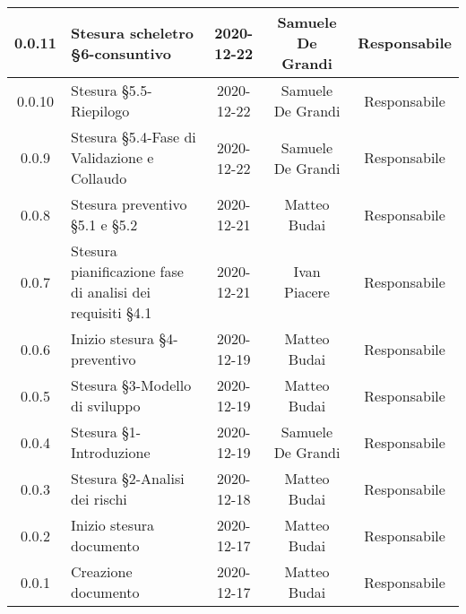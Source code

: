 \begin{center}
\begin{longtable}{|c|p{5cm}|c|c|c|}
	\hline
	0.0.11 & Stesura scheletro §6-consuntivo & 2020-12-22 & Samuele De Grandi & Responsabile \\
	\hline
	0.0.10 & Stesura §5.5-Riepilogo & 2020-12-22 & Samuele De Grandi & Responsabile \\
	\hline
	0.0.9 & Stesura §5.4-Fase di Validazione e Collaudo & 2020-12-22 & Samuele De Grandi & Responsabile \\
	\hline
	0.0.8 & Stesura preventivo §5.1 e §5.2 & 2020-12-21 & Matteo Budai & Responsabile \\
	\hline
	0.0.7 & Stesura pianificazione fase di analisi dei requisiti §4.1 & 2020-12-21 & Ivan Piacere & Responsabile \\
	\hline
	0.0.6 & Inizio stesura §4-preventivo & 2020-12-19 & Matteo Budai & Responsabile \\
	\hline
	0.0.5 & Stesura §3-Modello di sviluppo & 2020-12-19 & Matteo Budai & Responsabile \\
	\hline
	0.0.4 & Stesura §1-Introduzione & 2020-12-19 & Samuele De Grandi & Responsabile \\
	\hline
	0.0.3 & Stesura §2-Analisi dei rischi & 2020-12-18 & Matteo Budai & Responsabile \\
	\hline
	0.0.2 & Inizio stesura documento & 2020-12-17 & Matteo Budai & Responsabile \\
	\hline
	0.0.1 & Creazione documento & 2020-12-17 & Matteo Budai & Responsabile \\
	\hline

	\end{longtable}
\end{center}
